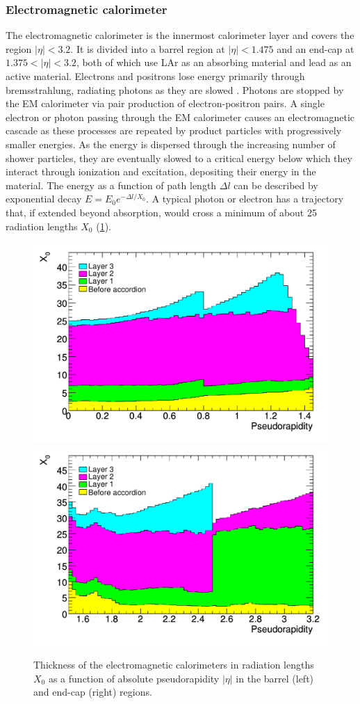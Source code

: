 \subsubsection{Electromagnetic calorimeter}

The electromagnetic calorimeter is the innermost calorimeter layer and covers the region $|\eta| < 3.2$.
It is divided into a barrel region at $|\eta| < 1.475$ and an end-cap at $1.375 < |\eta| < 3.2$, both of which use \ac{LAr} as an absorbing material \cite{ATLAS:1996ab} and lead as an active material. %
Electrons and positrons lose energy primarily through bremsstrahlung, radiating photons as they are slowed \cite{Fabjan:2003aq}.
Photons are stopped by the \ac{EM} calorimeter via pair production of electron-positron pairs.
A single electron or photon passing through the \ac{EM} calorimeter causes an electromagnetic cascade as these processes are repeated by product particles with progressively smaller energies.
As the energy is dispersed through the increasing number of shower particles, they are eventually slowed to a critical energy below which they interact through ionization and excitation, depositing their energy in the material.
The energy as a function of path length $\Delta l$ can be described by exponential decay \(E = E_0 e^{-\Delta l / X_0} \).
A typical photon or electron has a trajectory that, if extended beyond absorption, would cross a minimum of about 25 radiation lengths $X_0$ (\cref{fig:atlas_em_rad_length}).

\begin{figure}[t]
\includegraphics[width=0.49\linewidth]{x0_layers_barrel.pdf}
\includegraphics[width=0.49\linewidth]{x0_layers_endcap.pdf}
\caption{Thickness of the electromagnetic calorimeters in radiation lengths $X_0$ as a function of absolute pseudorapidity $|\eta|$ in the barrel (left) and end-cap (right) regions.}
\label{fig:atlas_em_rad_length}
\end{figure}

